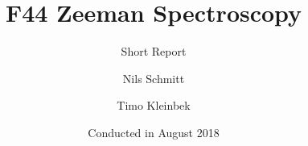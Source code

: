 \documentclass[12pt,
				 a4paper,
				numbers=endperiod
				 ]{scrartcl}
\title{F44 Zeeman Spectroscopy}
\subtitle{Short Report}
\author{Nils Schmitt \and Timo Kleinbek}
\date{Conducted in August 2018}
\begin{document}
\twocolumn
\maketitle





\nocite{*}
\printbibliography
\end{document}
